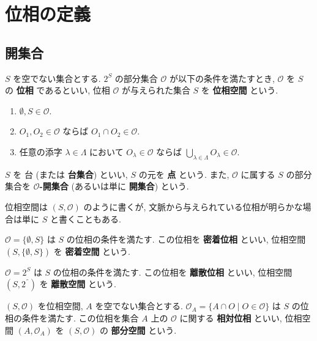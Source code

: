 \section{位相の定義}

\subsection{開集合}

\begin{framed}
    \begin{dfn}[位相の定義と開集合]\label{dfn::topology}
        $S$ を空でない集合とする. $2^S$ の部分集合 $\mathcal{O}$ が以下の条件を満たすとき, $\mathcal{O}$ を $S$ の \textbf{位相} であるといい, 位相 $\mathcal{O}$ が与えられた集合 $S$ を \textbf{位相空間} という.

        \begin{enumerate}
            \item $\displaystyle \emptyset, S\in\mathcal{O}.$
            \item $O_1, O_2\in\mathcal{O}$ ならば $O_1\cap O_2\in\mathcal{O}.$
            \item 任意の添字 $\lambda\in\Lambda$ において $O_\lambda\in\mathcal{O}$ ならば $\displaystyle\bigcup_{\lambda\in\Lambda}O_\lambda\in\mathcal{O}.$
        \end{enumerate}

        $S$ を $\textbf{台}$ (または \textbf{台集合}) といい, $S$ の元を \textbf{点} という.
        また, $\mathcal{O}$ に属する $S$ の部分集合を \textbf{$\mathcal{O}$-開集合} (あるいは単に \textbf{開集合}) という.

    \end{dfn}
\end{framed}


位相空間は $(S,\mathcal{O})$ のように書くが, 文脈から与えられている位相が明らかな場合は単に $S$ と書くこともある.

\begin{exa}
    $\mathcal{O}=\{\emptyset,S\}$ は $S$ の位相の条件を満たす. この位相を \textbf{密着位相} といい, 位相空間 $(S, \{\emptyset, S\})$ を \textbf{密着空間} という.
\end{exa}

\begin{exa}
    $\mathcal{O}=2^S$ は $S$ の位相の条件を満たす. この位相を \textbf{離散位相} といい, 位相空間 $(S, 2^˝)$ を \textbf{離散空間} という.
\end{exa}

\begin{exa}
    $(S, \mathcal{O})$ を位相空間, $A$ を空でない集合とする.
    $\mathcal{O}_A=\{A\cap O\mid O\in\mathcal{O}\}$ は $S$ の位相の条件を満たす. この位相を集合 $A$ 上の $\mathcal{O}$ に関する \textbf{相対位相} といい, 位相空間 $(A, \mathcal{O}_A)$ を $(S, \mathcal{O})$ の \textbf{部分空間} という.

\end{exa}


